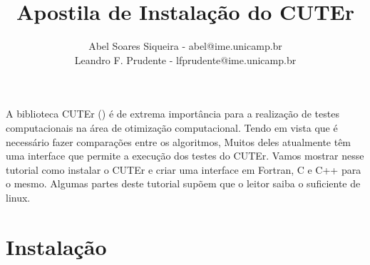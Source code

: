 \documentclass[letterpaper,11pt]{article}
\title{Apostila de Instalação do CUTEr}
\author{
Abel Soares Siqueira - {\small abel@ime.unicamp.br} \\ 
Leandro F. Prudente - {\small lfprudente@ime.unicamp.br}}
\numberwithin{equation}{section}
\begin{document}
\maketitle
\tableofcontents
\vspace{1 cm}

A biblioteca CUTEr (\cite{bib:cuter1,bib:cuter2}) é de extrema importância para a
realização de testes computacionais na área de otimização computacional. 
Tendo em vista que é necessário fazer comparações entre os algoritmos,
Muitos deles atualmente têm uma interface que permite a execução dos testes
do CUTEr. Vamos mostrar nesse tutorial como instalar o CUTEr e criar uma interface
em Fortran, C e C++ para o mesmo. Algumas partes deste tutorial supõem que o leitor
saiba o suficiente de linux.

\section{Instalação}
\end{document}
